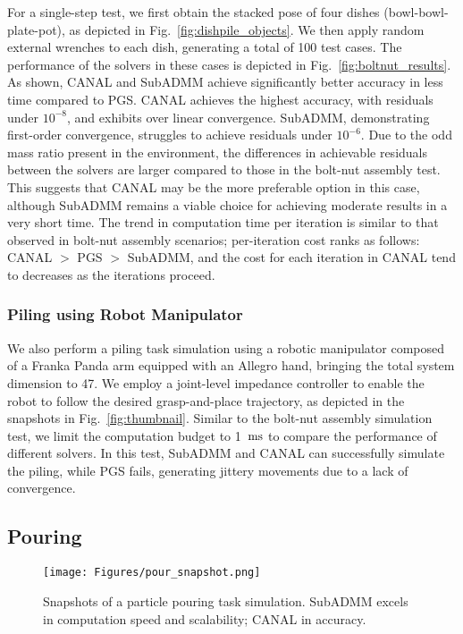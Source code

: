 \documentclass[lettersize,journal]{IEEEtran}
\begin{document}
For a single-step test, we first obtain the stacked pose of four dishes (bowl-bowl-plate-pot), as depicted in Fig.~\ref{fig:dishpile_objects}. 
We then apply random external wrenches to each dish, generating a total of 100 test cases. 
The performance of the solvers in these cases is depicted in Fig.~\ref{fig:boltnut_results}. 
As shown, CANAL and SubADMM achieve significantly better accuracy in less time compared to PGS. 
CANAL achieves the highest accuracy, with residuals under $10^{-8}$, and exhibits over linear convergence. SubADMM, demonstrating first-order convergence, struggles to achieve residuals under $10^{-6}$. Due to the odd mass ratio present in the environment, the differences in achievable residuals between the solvers are larger compared to those in the bolt-nut assembly test. This suggests that CANAL may be the more preferable option in this case, although SubADMM remains a viable choice for achieving moderate results in a very short time.
The trend in computation time per iteration is similar to that observed in bolt-nut assembly scenarios; per-iteration cost ranks as follows: CANAL $>$ PGS $>$ SubADMM, and the cost for each iteration in CANAL tend to decreases as the iterations proceed.


\subsubsection{Piling using Robot Manipulator}

We also perform a piling task simulation using a robotic manipulator composed of a Franka Panda arm equipped with an Allegro hand, bringing the total system dimension to 47. We employ a joint-level impedance controller to enable the robot to follow the desired grasp-and-place trajectory, as depicted in the snapshots in Fig.~\ref{fig:thumbnail}. Similar to the bolt-nut assembly simulation test, we limit the computation budget to 1~$\rm{ms}$ to compare the performance of different solvers. In this test, SubADMM and CANAL can successfully simulate the piling, while PGS fails, generating jittery movements due to a lack of convergence.


\subsection{Pouring}

\begin{figure}[t]
\centering
\texttt{[image: Figures/pour\_snapshot.png]}
\caption{Snapshots of a particle pouring task simulation. SubADMM excels in computation speed and scalability; CANAL in accuracy.}
\label{fig:pouring_snapshot}
\end{figure}
\end{document}
